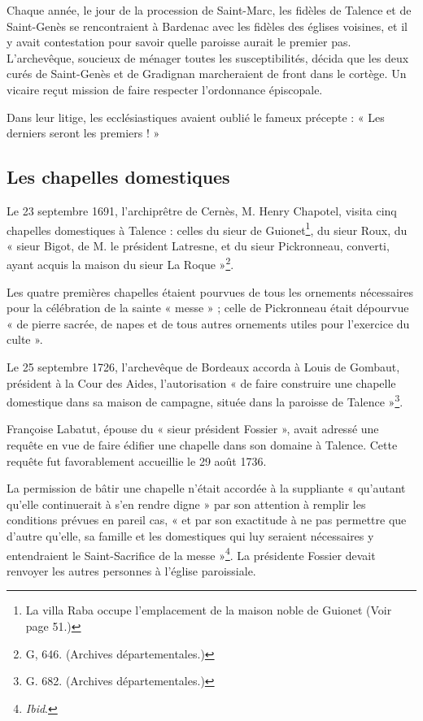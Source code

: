 Chaque année, le jour de la procession de Saint-Marc, les fidèles de Talence et de Saint-Genès se rencontraient à Bardenac avec les fidèles des églises voisines, et il y avait contestation pour savoir quelle paroisse aurait le premier pas. L'archevêque, soucieux de ménager toutes les susceptibilités, décida que les deux curés de Saint-Genès et de Gradignan marcheraient de front dans le cortège. Un vicaire reçut mission de faire respecter l'ordonnance épiscopale.

Dans leur litige, les ecclésiastiques avaient oublié le fameux précepte : « Les derniers seront les premiers ! »

\subsection{Les chapelles domestiques}

Le 23 septembre 1691, l'archiprêtre de Cernès, M. Henry Chapotel, visita cinq chapelles domestiques à Talence : celles du sieur de Guionet\footnote{La villa Raba occupe l'emplacement de la maison noble de Guionet (Voir page 51.)}, du sieur Roux, du « sieur Bigot, de M. le président Latresne, et du sieur Pickronneau, converti, ayant acquis la maison du sieur La Roque »\footnote{G, 646. (Archives départementales.)}.

Les quatre premières chapelles étaient pourvues de tous les ornements nécessaires pour la célébration de la sainte « messe » ; celle de Pickronneau était dépourvue « de pierre sacrée, de napes et de tous autres ornements utiles pour l'exercice du culte ».

Le 25 septembre 1726, l'archevêque de Bordeaux accorda à Louis de Gombaut, président à la Cour des Aides, l'autorisation « de faire construire une chapelle domestique dans sa maison de campagne, située dans la paroisse de Talence »\footnote{G. 682. (Archives départementales.)}.

Françoise Labatut, épouse du « sieur président Fossier », avait adressé une requête en vue de faire édifier une chapelle dans son domaine à Talence. Cette requête fut favorablement accueillie le 29 août 1736.

La permission de bâtir une chapelle n'était accordée à la suppliante « qu'autant qu'elle continuerait à s'en rendre digne » par son attention à remplir les conditions prévues en pareil cas, « et par son exactitude à ne pas permettre que d'autre qu'elle, sa famille et les domestiques qui luy seraient nécessaires y entendraient le Saint-Sacrifice de la messe »\footnote{\textit{Ibid}.}. La présidente Fossier devait renvoyer les autres personnes à l'église paroissiale.

